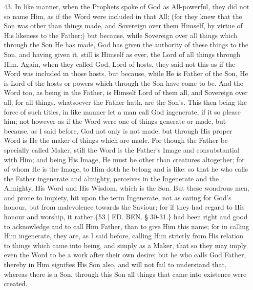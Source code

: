 43. In like manner, when the
Prophets spoke of God as All-powerful, they did not so name Him, as if
the Word were included in that All; (for they knew that the Son was
other than things made, and Sovereign over them Himself, by virtue of
His likeness to the Father;) but because, while Sovereign over all
things which through the Son He has made, God has given the authority
of these things to the Son, and having given it, still is Himself as
ever, the Lord of all things through Him. Again, when they called God,
Lord of hosts, they said not this as if the Word was included in those
hosts, but because, while He is Father of the Son, He is Lord of the
hosts or powers which through the Son have come to be. And the Word
too, as being in the Father, is Himself Lord of them all, and
Sovereign over all; for all things, whatsoever the Father hath, are
the Son's. This then being the force of such titles, in like manner
let a man call God ingenerate, if it so please him; not however as if
the Word were one of things generate or made, but because, as I said
before, God not only is not made, but through His proper Word is He
the maker of things which are made. For though the Father be specially
called Maker, still the Word is the Father's Image and consubstantial
with Him; and being His Image, He must be other than creatures
altogether; for of whom He is the Image, to Him doth he belong and is
like: so that he who calls the Father ingenerate and almighty,
perceives in the Ingenerate and the Almighty, His Word and His Wisdom,
which is the Son. But these wondrous men, and prone to impiety, hit
upon the term Ingenerate, not as caring for God's honour, but from
malevolence towards the Saviour; for if they had regard to His honour
and worship, it rather \{53 | ED. BEN.
§ 30-31.\} had been right and good to acknowledge and to call Him
Father, than to give Him this name; for in calling Him ingenerate,
they are, as I said before, calling Him strictly from His relation to
things which came into being, and simply as a Maker, that so they may
imply even the Word to be a work after their own desire; but he who
calls God Father, thereby in Him signifies His Son also, and will not
fail to understand that, whereas there is a Son, through this Son all
things that came into existence were created.

